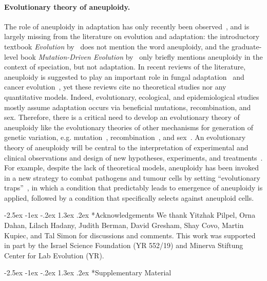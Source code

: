 \documentclass[12pt]{extarticle}
\makeatletter
\renewcommand\section{\@startsection {section}{1}{\z@}%
     {-2.5ex \@plus -1ex \@minus -.2ex}%
     {1.3ex \@plus.2ex}%
    {\Large\bfseries}}
\newcommand{\beginsupplement}{%
      	\setcounter{table}{0}
        \renewcommand{\thetable}{S\arabic{table}}%
        \setcounter{figure}{0}
        \renewcommand{\thefigure}{S\arabic{figure}}%
}
\makeatother
\begin{document}
\paragraph*{Evolutionary theory of aneuploidy.}
The role of aneuploidy in adaptation has only recently been observed~\citep{Sionov2010, Yona2012, Gerstein2015}, and is largely missing from the literature on evolution and adaptation:
the introductory textbook \emph{Evolution} by~\citet{Bergstrom2012} does not mention the word aneuploidy, and the graduate-level book \emph{Mutation-Driven Evolution} by~\citet{Nei2013} only briefly mentions aneuploidy in the context of speciation, but not adaptation.
In recent reviews of the literature, aneuploidy is suggested to play an important role in fungal adaptation~\citep{Robbins2017, Todd2017} and cancer evolution~\citep{Santaguida2015review, Naylor2016, Sansregret2017}, yet these reviews cite no theoretical studies nor any quantitative models.
Indeed, evolutionary, ecological, and epidemiological studies mostly assume adaptation occurs via beneficial mutations, recombination, and sex.
Therefore, there is a critical need to develop an evolutionary theory of aneuploidy like the evolutionary theories of other mechanisms for generation of genetic variation, e.g. mutation~\citep{Lynch2010}, recombination~\citep{Hartfield2012}, and sex~\citep{Otto2009}.
An evolutionary theory of aneuploidy will be central to the interpretation of experimental and clinical observations and design of new hypotheses, experiments, and treatments~\citep{Carja2014}.
For example, despite the lack of theoretical models, aneuploidy has been invoked in a new strategy to combat pathogens and tumour cells by setting “evolutionary traps”~\citep{Gerstein2015,Chen2015}, in which a condition that predictably leads to emergence of aneuploidy is applied, followed by a condition that specifically selects against aneuploid cells.

\pagebreak
{\small
\section*{Acknowledgements}
We thank Yitzhak Pilpel, Orna Dahan, Lilach Hadany, Judith Berman, David Gresham, Shay Covo, Martin Kupiec, and Tal Simon for discussions and comments.
This work was supported in part by 
the Israel Science Foundation (YR 552/19) and
Minerva Stiftung Center for Lab Evolution (YR).
}




\section*{Supplementary Material}
\beginsupplement %
\end{document}

